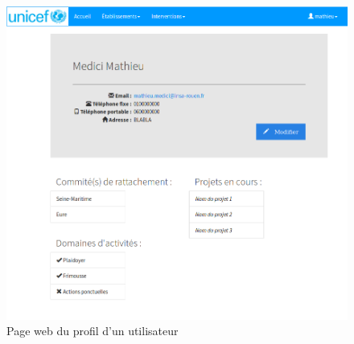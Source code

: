 \begin{frame}[plain]
\begin{figure}[!h]
	\begin{center}
	\includegraphics[scale=0.25]{images/profil.png}
	\caption{Page web du profil d'un utilisateur}
	\end{center}
\end{figure}
\end{frame}


